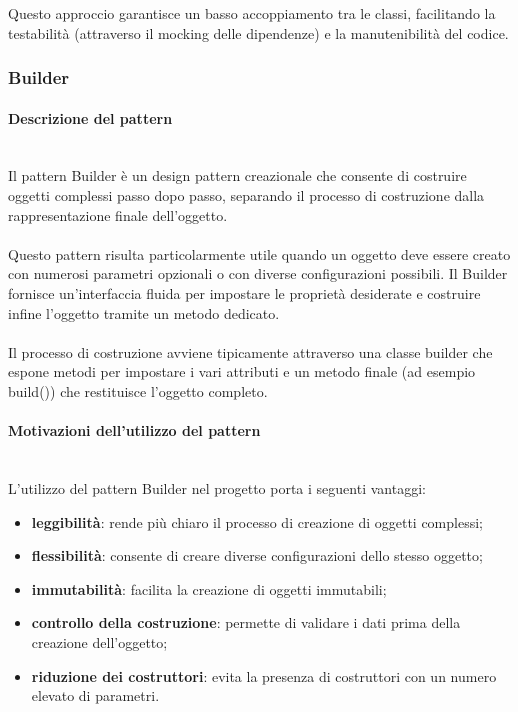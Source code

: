 \documentclass[a4paper,12pt]{article}
\begin{document}
{{{                \noindent Questo approccio garantisce un basso accoppiamento tra le classi, facilitando la testabilità (attraverso il mocking delle dipendenze) e la manutenibilità del codice.
            }
            \subsubsection{Builder} {
                \paragraph{Descrizione del pattern}\mbox{}\\
                Il pattern Builder è un design pattern creazionale che consente di costruire oggetti complessi passo dopo passo, separando il processo di costruzione dalla rappresentazione finale dell’oggetto.\\
                \\
                Questo pattern risulta particolarmente utile quando un oggetto deve essere creato con numerosi parametri opzionali o con diverse configurazioni possibili. Il Builder fornisce un’interfaccia fluida per impostare le proprietà desiderate e costruire infine l’oggetto tramite un metodo dedicato.\\
                \\
                Il processo di costruzione avviene tipicamente attraverso una classe builder che espone metodi per impostare i vari attributi e un metodo finale (ad esempio build()) che restituisce l’oggetto completo.
                
                \paragraph{Motivazioni dell’utilizzo del pattern}\mbox{}\\
                L’utilizzo del pattern Builder nel progetto porta i seguenti vantaggi:
                \begin{itemize}
                    \item \textbf{leggibilità}: rende più chiaro il processo di creazione di oggetti complessi;
                    \item \textbf{flessibilità}: consente di creare diverse configurazioni dello stesso oggetto;
                    \item \textbf{immutabilità}: facilita la creazione di oggetti immutabili;
                    \item \textbf{controllo della costruzione}: permette di validare i dati prima della creazione dell’oggetto;
                    \item \textbf{riduzione dei costruttori}: evita la presenza di costruttori con un numero elevato di parametri.
                \end{itemize}
                
}}}
\end{document}
